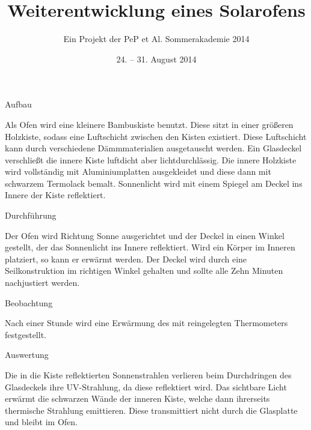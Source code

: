 

\title{Weiterentwicklung eines Solarofens}
\subtitle{Ein Projekt der PeP et Al. Sommerakademie 2014}
\date{24. -- 31. August 2014}

\author{

}



\maketitle
\tableofcontents

Aufbau

Als Ofen wird eine kleinere Bambuskiste benutzt. Diese sitzt in einer größeren Holzkiste, sodass eine Luftschicht zwischen den Kisten existiert. Diese Luftschicht kann durch verschiedene Dämmmaterialien ausgetauscht werden. Ein Glasdeckel verschließt die innere Kiste luftdicht aber lichtdurchlässig. Die innere Holzkiste wird vollständig mit Aluminiumplatten ausgekleidet und diese dann mit schwarzem Termolack bemalt. Sonnenlicht wird mit einem Spiegel am Deckel ins Innere der Kiste reflektiert. 

Durchführung

Der Ofen wird Richtung Sonne ausgerichtet und der Deckel in einen Winkel gestellt, der das Sonnenlicht ins Innere reflektiert. Wird ein Körper im Inneren platziert, so kann er erwärmt werden. 
Der Deckel wird durch eine Seilkonstruktion im richtigen Winkel gehalten und sollte alle Zehn Minuten nachjustiert werden.

Beobachtung

Nach einer Stunde wird eine Erwärmung des mit reingelegten Thermometers festgestellt. 

Auswertung

Die in die Kiste reflektierten Sonnenstrahlen verlieren beim Durchdringen des Glasdeckels ihre UV-Strahlung, da diese reflektiert wird. Das sichtbare Licht erwärmt die schwarzen Wände der inneren Kiste, welche dann ihrerseits thermische Strahlung emittieren. Diese transmittiert nicht durch die Glasplatte und bleibt im Ofen.

